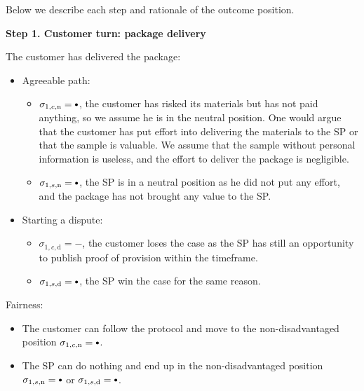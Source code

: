 \documentclass{ieeeaccess}
\newcommand\sbullet[1][.75]{\mathbin{\ThisStyle{\vcenter{\hbox{%
  \scalebox{#1}{$\SavedStyle\bullet$}}}}}%
}
\begin{document}
Below we describe each step and rationale of the outcome position.

\noindent \textbf
{Step 1. Customer turn: package delivery}\label{step-1-deliver-package}

The customer has delivered the package:

\begin{itemize}
\item
  Agreeable path:

  \begin{itemize}
  
  \item
    \(\sigma_{1, c, \mathrm{n}} = \sbullet\), the customer has risked its materials but has not paid anything, so we assume he is in the neutral position. One would argue that the customer has put effort into delivering the materials to the SP or that the sample is valuable. We assume that the sample without personal information is useless, and the effort to deliver the package is negligible.
  \item
    \(\sigma_{1, s, \mathrm{n}} = \sbullet\), the SP is in a neutral position as he did not put any effort, and the package has not brought any value to the SP.
  \end{itemize}
\item
  Starting a dispute:

  \begin{itemize}
  
  \item
    \(\sigma_{1, c, \mathrm{d}} = -\), the customer loses the case as the SP has still an opportunity to publish proof of provision within the timeframe.
  \item
    \(\sigma_{1, s, \mathrm{d}} = \sbullet\), the SP win the case for the same reason.
  \end{itemize}
\end{itemize}

Fairness:

\begin{itemize}

\item
  The customer can follow the protocol and move to the non-disadvantaged position \(\sigma_{1, c, \mathrm{n}} = \sbullet\).
\item
  The SP can do nothing and end up in the non-disadvantaged position \(\sigma_{1, s, \mathrm{n}} = \sbullet \) or \(\sigma_{1, s, \mathrm{d}} = \sbullet \).
\end{itemize}
\end{document}
